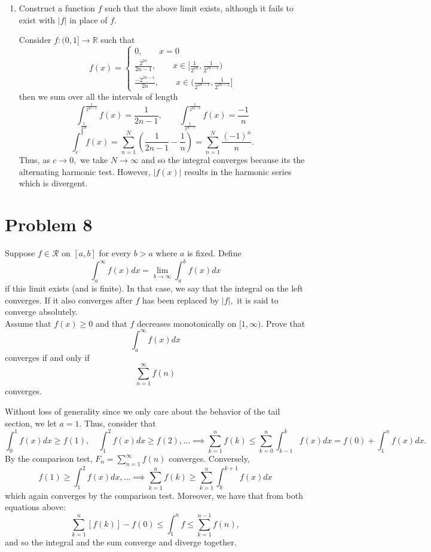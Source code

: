 \documentclass[11pt]{article}
\newcommand{\bbR}{\mathbb{R}}
\begin{document}
\begin{enumerate}
\begin{solution}
    \end{solution}
    \item 
    \begin{problem}
        Construct a function $f$ such that the above limit exists, although it fails to exist with $|f|$ in place of $f.$
    \end{problem}
    \begin{solution}
        Consider $f:(0,1]\to \bbR$ such that 
        \[f(x) = 
        \begin{cases}
            0, \qquad x = 0\\
            \frac{2^{2n}}{2n-1}, \qquad x\in [\frac{1}{2^{2n}}, \frac{1}{2^{2n-1}})\\
            \frac{-2^{2n-1}}{2n}, \qquad x\in (\frac{1}{2^{2n-1}}, \frac{1}{2^{2n-2}}]
        \end{cases}
        \]
        then we sum over all the intervals of length 
        \[\int_{\frac{1}{2^{2n}}}^\frac{1}{2^{2n-1}} f(x) = \frac{1}{2n-1}, \qquad \int_\frac{1}{2^{2n-1}}^ \frac{1}{2^{2n-2}}f(x) = \frac{-1}{n}\]
        \[\int_c^1 f(x) = \sum_{n=1}^N (\frac{1}{2n-1} - \frac{1}{n}) = \sum_{n=1}^N \frac{(-1)^{n}}{n}.\] Thus, as $c\to 0,$ we take $N\to \infty$ and so the integral converges because its the alternating harmonic test. However, $|f(x)|$ results in the harmonic series which is divergent.
    \end{solution}
\end{enumerate}

\newpage
\section*{Problem 8}
\begin{problem}
    Suppose $f\in \mathcal{R}$ on $[a,b]$ for every $b>a$ where $a$ is fixed. Define 
    \[\int_a^\infty f(x)dx =\lim_{b\to \infty}\int_a^b f(x)dx\] if this limit exists (and is finite). In that case, we say that the integral on the left converges. If it also converges after $f$ has been replaced by $|f|,$ it is said to converge absolutely.\\
    Assume that $f(x)\geq 0$ and that $f$ decreases monotonically on $[1, \infty).$ Prove that 
    \[\int_a^\infty f(x)dx\] converges if and only if 
    \[\sum_{n=1}^\infty f(n)\] converges.
\end{problem}
\begin{solution}
Without loss of generality since we only care about the behavior of the tail section, we let $a = 1.$ Thus, consider that 
\[\int_0^1f(x)dx \geq f(1), \quad \int_1^2 f(x)dx \geq f(2), \dots \implies \sum_{k=1}^n f(k) \leq \sum_{k=0}^n \int_{k-1}^{k}f(x)dx= f(0) + \int_1^n f(x)dx.\] By the comparison test, $F_n = \sum_{n=1}^\infty f(n)$ converges. Conversely, 
\[f(1)\geq \int_1^2 f(x)dx, \dots \implies \sum_{k=1}^n f(k) \geq \sum_{k=1}^n \int_{k}^{k+1}f(x)dx\] which again converges by the comparison test. Moreover, we have that from both equations above:
\[\sum_{k=1}^n [f(k)] - f(0) \leq \int_1^n f \leq \sum_{k=1}^{n-1} f(n),\] and so the integral and the sum converge and diverge together.
\end{solution}
\end{document}
